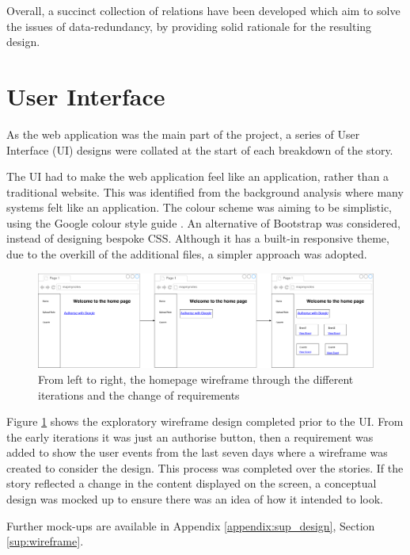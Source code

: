 \noindent
Overall, a succinct collection of relations have been developed which aim to solve the issues of data-redundancy, by providing solid rationale for the resulting design.


\section{User Interface}
As the web application was the main part of the project, a series of User Interface (UI) designs were collated at the start of each breakdown of the story.

The UI had to make the web application feel like an application, rather than a traditional website. This was identified from the background analysis where many systems felt like an application. The colour scheme was aiming to be simplistic, using the Google colour style guide \cite{citeulike:14023831}. An alternative of Bootstrap \cite{citeulike:13995818} was considered, instead of designing bespoke CSS. Although it has a built-in responsive theme, due to the overkill of the additional files, a simpler approach was adopted.

\begin{figure}[H]
  \centering
  \includegraphics[scale=0.23]{images/homepage_wiremock.pdf}
  \caption{From left to right, the homepage wireframe through the different iterations and the change of requirements}
  \label{fig:homepage_wireframe}
\end{figure}

Figure \ref{fig:homepage_wireframe} shows the exploratory wireframe design completed prior to the UI. From the early iterations it was just an authorise button, then a requirement was added to show the user events from the last seven days where a wireframe was created to consider the design. This process was completed over the stories. If the story reflected a change in the content displayed on the screen, a conceptual design was mocked up to ensure there was an idea of how it intended to look.


Further mock-ups are available in Appendix \ref{appendix:sup_design}, Section \ref{sup:wireframe}.


